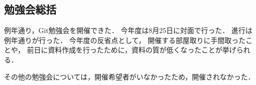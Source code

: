 \subsection*{勉強会総括}

例年通り，Git勉強会を開催できた．
今年度は8月25日に対面で行った．
進行は例年通り\secondGrade{}が行った．
今年度の反省点として，
開催する部屋取りに手間取ったことや，
前日に資料作成を行ったために，資料の質が低くなったことが挙げられる．

その他の勉強会については，開催希望者がいなかったため，開催されなかった．
